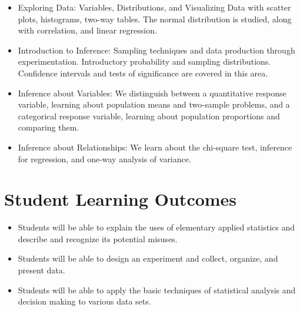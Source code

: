 \documentclass[letterpaper, landscape]{article}
\begin{document}
  \begin{itemize}

    \item Exploring Data: Variables, Distributions, and Visualizing Data with
      scatter plots, histograms, two-way tables. The normal distribution is
      studied, along with correlation, and linear regression.

    \item Introduction to Inference: Sampling techniques and data production
      through experimentation. Introductory probability and sampling
      distributions. Confidence intervals and tests of significance are covered
      in this area.

    \item Inference about Variables: We distinguish between a quantitative
      response variable, learning about population means and two-sample
      problems, and a categorical response variable, learning about population
      proportions and comparing them.

    \item Inference about Relationships: We learn about the chi-square test,
      inference for regression, and one-way analysis of variance.

  \end{itemize}

  \section{Student Learning Outcomes}
  \begin{itemize}
    \item Students will be able to explain the uses of elementary applied
      statistics and describe and recognize its potential misuses.

    \item Students will be able to design an experiment and collect, organize,
      and present data.

    \item Students will be able to apply the basic techniques of statistical
      analysis and decision making to various data sets.

  \end{itemize}


\end{document}
